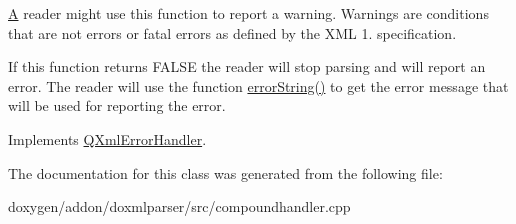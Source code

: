 \mbox{\hyperlink{class_a}{A}} reader might use this function to report a warning. Warnings are conditions that are not errors or fatal errors as defined by the X\+ML 1. specification.

If this function returns F\+A\+L\+SE the reader will stop parsing and will report an error. The reader will use the function \mbox{\hyperlink{class_compound_error_handler_aceb61310e8c5649d6390a8dff0992caf}{error\+String()}} to get the error message that will be used for reporting the error. 

Implements \mbox{\hyperlink{class_q_xml_error_handler_a79ae0cce3316a76b7777c6e90b101afe}{Q\+Xml\+Error\+Handler}}.



The documentation for this class was generated from the following file\+:\begin{DoxyCompactItemize}
\item 
doxygen/addon/doxmlparser/src/compoundhandler.\+cpp\end{DoxyCompactItemize}
